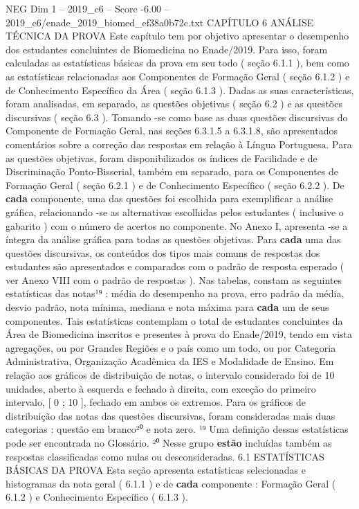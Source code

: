\begin{textsample}{NEG Dim 1 – 2019\_c6 – Score -6.00 – 2019\_c6/enade\_2019\_biomed\_ef38a0b72c.txt}  \label{ex:f1_neg_095}
CAPÍTULO 6 ANÁLISE TÉCNICA DA PROVA Este capítulo tem por objetivo apresentar o desempenho dos estudantes concluintes de Biomedicina no Enade/2019.
Para isso, foram calculadas as estatísticas básicas da prova em seu todo ( seção 6.1.1 ), bem como as estatísticas relacionadas aos Componentes de Formação Geral ( seção 6.1.2 ) e de Conhecimento Específico da Área ( seção 6.1.3 ).
Dadas as suas características, foram analisadas, em separado, as questões objetivas ( seção 6.2 ) e as questões discursivas ( seção 6.3 ).
Tomando -se como base as duas questões discursivas do Componente de Formação Geral, nas seções 6.3.1.5 a 6.3.1.8, são apresentados comentários sobre a correção das respostas em relação à Língua Portuguesa.
Para as questões objetivas, foram disponibilizados os índices de Facilidade e de Discriminação Ponto-Bisserial, também em separado, para os Componentes de Formação Geral ( seção 6.2.1 ) e de Conhecimento Específico ( seção 6.2.2 ).
De \textbf{cada} componente, uma das questões foi escolhida para exemplificar a análise gráfica, relacionando -se as alternativas escolhidas pelos estudantes ( inclusive o gabarito ) com o número de acertos no componente.
No Anexo I, apresenta -se a íntegra da análise gráfica para todas as questões objetivas.
Para \textbf{cada} uma das questões discursivas, os conteúdos dos tipos mais comuns de respostas dos estudantes são apresentados e comparados com o padrão de resposta esperado ( ver Anexo VIII com o padrão de respostas ).
Nas tabelas, constam as seguintes estatísticas das notas¹⁹ : média do desempenho na prova, erro padrão da média, desvio padrão, nota mínima, mediana e nota máxima para \textbf{cada} um de seus componentes.
Tais estatísticas contemplam o total de estudantes concluintes da Área de Biomedicina inscritos e presentes à prova do Enade/2019, tendo em vista agregações, ou por Grandes Regiões e o país como um todo, ou por Categoria Administrativa, Organização Acadêmica da IES e Modalidade de Ensino.
Em relação aos gráficos de distribuição de notas, o intervalo considerado foi de 10 unidades, aberto à esquerda e fechado à direita, com exceção do primeiro intervalo, [ 0 ; 10 ], fechado em ambos os extremos.
Para os gráficos de distribuição das notas das questões discursivas, foram consideradas mais duas categorias : questão em branco²⁰ e nota zero. ¹⁹ Uma definição dessas estatísticas pode ser encontrada no Glossário. ²⁰ Nesse grupo \textbf{estão} incluídas também as respostas classificadas como nulas ou desconsideradas. 6.1 ESTATÍSTICAS BÁSICAS DA PROVA Esta seção apresenta estatísticas selecionadas e histogramas da nota geral ( 6.1.1 ) e de \textbf{cada} componente : Formação Geral ( 6.1.2 ) e Conhecimento Específico ( 6.1.3 ).

\end{textsample}
